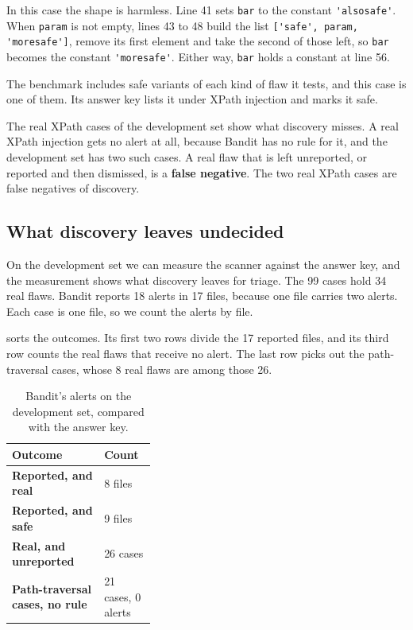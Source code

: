 In this case the shape is harmless. Line 41 sets \texttt{bar} to the constant
\lstinline|'alsosafe'|. When \texttt{param} is not empty, lines 43 to 48 build the list
\lstinline|['safe', param, 'moresafe']|, remove its first element and take the second of those left,
so \texttt{bar} becomes the constant \lstinline|'moresafe'|. Either way, \texttt{bar} holds a
constant at line 56.

The benchmark includes safe variants of each kind of flaw it tests, and this case is one of them.
Its answer key lists it under XPath injection and marks it safe.

The real XPath cases of the development set show what discovery misses. A real XPath injection gets
no alert at all, because Bandit has no rule for it, and the development set has two such cases. A
real flaw that is left unreported, or reported and then dismissed, is a \textbf{false negative}. The
two real XPath cases are false negatives of discovery.

\subsection{What discovery leaves undecided}
\label{sec:triage-undecided}

On the development set we can measure the scanner against the answer key, and the measurement shows
what discovery leaves for triage. The 99 cases hold 34 real flaws. Bandit reports 18 alerts in 17
files, because one file carries two alerts. Each case is one file, so we count the alerts by file.

 sorts the outcomes. Its first two rows divide the 17 reported files, and
its third row counts the real flaws that receive no alert. The last row picks out the path-traversal
cases, whose 8 real flaws are among those 26.

\begin{table}[htbp]
  \caption{Bandit's alerts on the development set, compared with the answer key.}
  \label{tab:triage-undecided}
  \begin{adjustbox}{width=\linewidth}\begin{tabularx}{\linewidth}{XL{0.36\linewidth}}
    \toprule
    \textbf{Outcome} & \textbf{Count} \\
    \midrule
    \textbf{Reported, and real} & 8 files \\
    \textbf{Reported, and safe} & 9 files \\
    \textbf{Real, and unreported} & 26 cases \\
    \textbf{Path-traversal cases, no rule} & 21 cases, 0 alerts \\
    \bottomrule
  \end{tabularx}\end{adjustbox}
\end{table}

